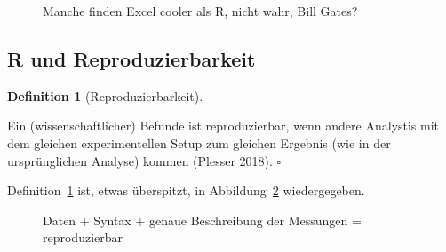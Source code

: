 \documentclass[
  a4paper,
  DIV=11]{scrreprt}
\theoremstyle{definition}
\theoremstyle{definition}
\theoremstyle{definition}
\newtheorem{definition}{Definition}[chapter]
\theoremstyle{remark}
\begin{document}
\begin{figure}


\caption{\label{fig-bill-excel}Manche finden Excel cooler als R, nicht
wahr, Bill Gates?}

\end{figure}%

\subsection{R und Reproduzierbarkeit}\label{r-und-reproduzierbarkeit}

\begin{definition}[Reproduzierbarkeit]\protect\hypertarget{def-repro}{}\label{def-repro}

Ein (wissenschaftlicher) Befunde ist reproduzierbar, wenn andere
Analystis mit dem gleichen experimentellen Setup zum gleichen Ergebnis
(wie in der ursprünglichen Analyse) kommen (Plesser 2018). \(\square\)

\end{definition}

Definition~\ref{def-repro} ist, etwas überspitzt, in
Abbildung~\ref{fig-repro} wiedergegeben.

\begin{figure}


\caption{\label{fig-repro}Daten + Syntax + genaue Beschreibung der
Messungen = reproduzierbar}

\end{figure}%
\end{document}

